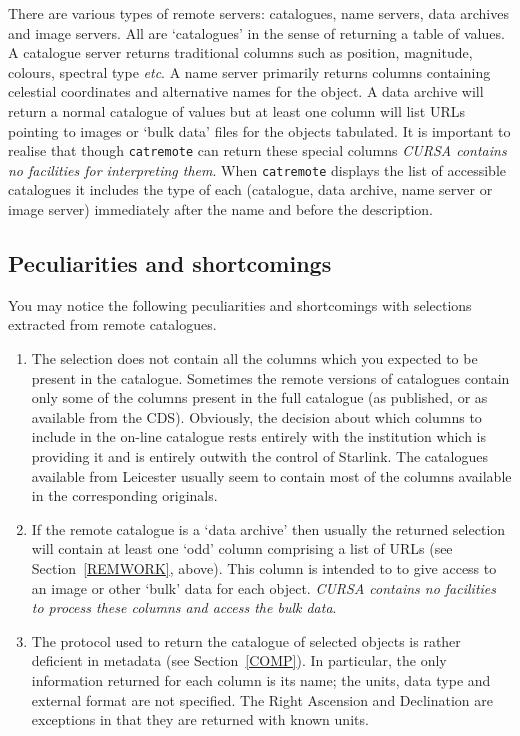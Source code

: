 \documentclass[twoside,11pt]{article}
\renewcommand{\_}{\texttt{\symbol{95}}}
\begin{document}
There are various types of remote servers: catalogues, name servers,
data archives and image servers.  All are `catalogues' in the sense of
returning a table of values.  A catalogue server returns traditional
columns such as position, magnitude, colours, spectral type \emph{etc}.
A name server primarily returns columns containing celestial coordinates
and alternative names for the object.  A data archive will return a normal
catalogue of values but at least one column will list URLs pointing to
images or `bulk data' files for the objects tabulated.  It is important to
realise that though {\tt catremote} can return these special columns {\it
CURSA contains no facilities for interpreting them}.  When {\tt catremote}
displays the list of accessible catalogues it includes the type of each
(catalogue, data archive, name server or image server) immediately after
the name and before the description.

\subsection{Peculiarities and shortcomings  \label{REMPEC} }

You may notice the following peculiarities and shortcomings with
selections extracted from remote catalogues.

\begin{enumerate}

  \item The selection does not contain all the columns which you
   expected to be present in the catalogue.  Sometimes the remote
   versions of catalogues contain only some of the columns present
   in the full catalogue (as published, or as available from the CDS).
   Obviously, the decision about which columns to include in the
   on-line catalogue rests entirely with the institution which is
   providing it and is entirely outwith the control of Starlink.
   The catalogues available from Leicester usually seem to contain
   most of the columns available in the corresponding originals.

  \item If the remote catalogue is a `data archive' then usually the
   returned selection will contain at least one `odd' column comprising a
   list of URLs (see Section~\ref{REMWORK}, above).  This column is
   intended to to give access to an image or other `bulk' data for each
   object.  {\it CURSA contains no facilities to process these columns
   and access the bulk data}.

  \item The protocol used to return the catalogue of selected objects
   is rather deficient in metadata (see Section~\ref{COMP}).  In particular,
   the only information returned for each column is its name; the units,
   data type and external format are not specified.  The Right Ascension
   and Declination are exceptions in that they are returned with known
   units.

\end{enumerate}
\end{document}
